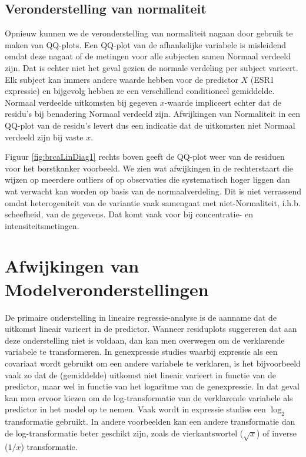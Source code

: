 \documentclass[
  12pt,dutch,coursenotes]{book}
\theoremstyle{definition}
\theoremstyle{definition}
\theoremstyle{definition}
\theoremstyle{definition}
\theoremstyle{remark}
\begin{document}
\hypertarget{veronderstelling-van-normaliteit}{%
\subsection{Veronderstelling van normaliteit}\label{veronderstelling-van-normaliteit}}

Opnieuw kunnen we de veronderstelling van normaliteit nagaan door gebruik te maken van QQ-plots. Een QQ-plot van de afhankelijke variabele is misleidend omdat deze nagaat of de metingen voor alle subjecten samen Normaal verdeeld zijn. Dat is echter niet het geval gezien de normale verdeling per subject varieert.
Elk subject kan immers andere waarde hebben voor de predictor \(X\) (ESR1 expressie) en bijgevolg hebben ze een verschillend conditioneel gemiddelde.
Normaal verdeelde uitkomsten bij gegeven \(x\)-waarde impliceert echter dat de
residu's bij benadering Normaal verdeeld zijn.
Afwijkingen van Normaliteit in een QQ-plot van de residu's levert dus een indicatie dat de uitkomsten niet Normaal
verdeeld zijn bij vaste \(x\).

Figuur \ref{fig:brcaLinDiag1} rechts boven geeft de QQ-plot weer van de residuen voor het borstkanker voorbeeld.
We zien wat afwijkingen in de rechterstaart die wijzen op meerdere outliers of op observaties die systematisch hoger liggen dan wat verwacht kan worden op basis van de normaalverdeling.
Dit is niet verrassend omdat heterogeniteit van de variantie vaak samengaat met niet-Normaliteit, i.h.b. scheefheid, van de gegevens.
Dat komt vaak voor bij concentratie- en intensiteitsmetingen.

\hypertarget{afwijkingen-van-modelveronderstellingen}{%
\section{Afwijkingen van Modelveronderstellingen}\label{afwijkingen-van-modelveronderstellingen}}

De primaire onderstelling in lineaire regressie-analyse is de aanname dat de uitkomst lineair varieert in de predictor.
Wanneer residuplots suggereren dat aan deze onderstelling niet is voldaan, dan kan men overwegen om de verklarende variabele te transformeren. In genexpressie studies waarbij expressie als een covariaat wordt gebruikt om een andere variabele te verklaren, is het bijvoorbeeld vaak zo dat de (gemiddelde) uitkomst niet lineair varieert in functie van de predictor, maar wel in functie van het logaritme van de genexpressie. In dat geval kan men ervoor kiezen om de log-transformatie van de verklarende variabele als predictor in het model op te nemen. Vaak wordt in expressie studies een \(\log_2\) transformatie gebruikt. In andere voorbeelden kan een andere transformatie dan de
log-transformatie beter geschikt zijn, zoals de vierkantswortel (\(\sqrt{x}\)) of inverse (\(1/x\)) transformatie.
\end{document}
